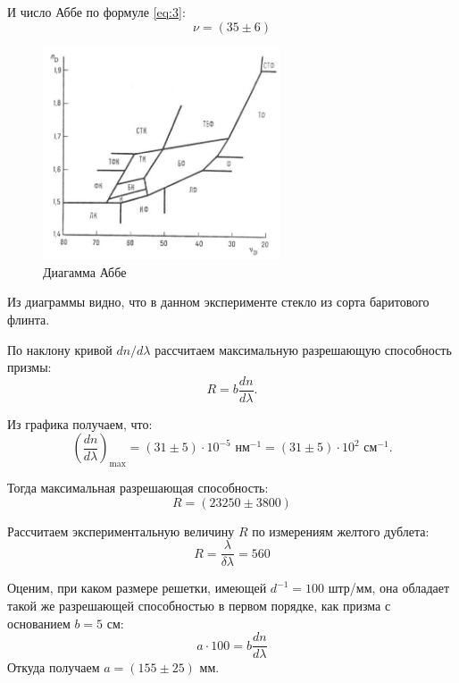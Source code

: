 \documentclass[12pt,a4paper]{article}
\begin{document}
	И число Аббе по формуле \ref{eq:3}:
	\begin{equation*}
		\boxed{\nu = (35 \pm 6)}
	\end{equation*}

    \begin{figure}[h]
		\begin{center}
			\includegraphics[width=7cm]{res/abbe.jpg}
			\caption{Диагамма Аббе}
            \label{fig:abe}
		\end{center}
	\end{figure}

	Из диаграммы видно, что в данном эксперименте стекло из сорта баритового флинта.
	
	
	По наклону кривой $dn/d\lambda$ рассчитаем максимальную разрешающую способность призмы:
	\begin{equation*}
		R = b\frac{dn}{d\lambda}.
	\end{equation*}	
	
	Из графика получаем, что:
	\begin{equation*}
		\left(\frac{dn}{d\lambda}\right)_{\text{max}} = (31 \pm 5) \cdot 10^{-5} \text{ нм}^{-1} = (31 \pm 5) \cdot 10^2 \text{ см}^{-1}.
	\end{equation*}

	Тогда максимальная разрешающая способность:
	\begin{equation*}
		\boxed{R = (23250 \pm 3800)}
	\end{equation*}

	Рассчитаем экспериментальную величину $R$ по измерениям желтого дублета:
	\begin{equation*}
		\boxed{R = \frac{\lambda}{\delta \lambda} = 560}
	\end{equation*}

	Оценим, при каком размере решетки, имеющей $d^{-1} = 100$ штр/мм, она обладает такой же разрешающей способностью в первом порядке, как призма с основанием $b = 5$ см:
	\begin{equation*}
		a\cdot 100 = b\frac{dn}{d\lambda}
	\end{equation*}
	Откуда получаем $a = (155 \pm 25)$ мм.
	
\end{document}
